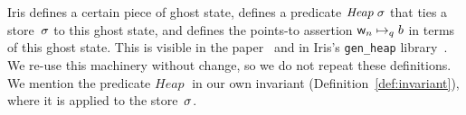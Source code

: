 \begin{comment}
A ghost memory cell in Iris is a memory cell that does not exist at runtime.
The ownership and the content of a physical memory cell are described via a
points-to predicate such as $\loc\pointsto\val$. Similarly, the ownership and
content of a ghost cell are described by an Iris assertion, usually written
$\ownGhost\gamma{a}$, where $\gamma$ is the name of the ghost cell and $a$ is
its content. Whereas the content of a physical memory cell is a
programming-language value~$\val$, the content of a ghost cell inhabits a
mathematical structure, a \emph{camera}~\cite[\S4.4]{iris}, which the user
chooses when the ghost cell is created. A camera is equipped with a
composition operation~$\cdot$ and the ghost state assertion satisfies the law
$\ownGhost\gamma{a\cdot b} \equiv \ownGhost\gamma{a} \star
\ownGhost\gamma{b}$. Thus, the choice of a suitable camera determines in what
ways the ghost state can be split.

A key Iris idiom involves the use of the \emph{authoritative
  camera}~\cite[\S6.3.3]{iris} together with an Iris invariant.
The elements of the authoritative camera include
\emph{authoritative elements} $\authfull{c}$ and
\emph{fragmentary elements} $\authfrag{b}$.
The composition law is defined in such a way that
there always exists at most one authoritative element
and the composition of all fragmentary elements in existence is
contained in the authoritative element, etc.
\end{comment}
\newcommand{\genheapinterp}[1]{\mathit{Heap}\;#1}
\newcommand{\pred}[1]{\ownGhost\gammaPred{\authfull{(\mapone\predstore)}}}
\newcommand{\mapone}[1]{1.#1}
\newcommand{\mapsfromexact}[3]{
  \ownGhost\gammaPred{\authfrag{\singletonMap{#1}{(#2, #3)}}}
}
\newcommand{\sh}{L'}
\newcommand{\mapsfromdef}[3]{
  \exists\sh.\;
  \mapsfromexact{#1}{#2}{\sh} \star \pure{\sh \subseteq #3}
}


\begin{assumption}
\label{assumption}
  Iris defines a certain piece of ghost state,
  defines a predicate $\genheapinterp\store$
  that ties a store~$\sigma$ to this ghost state,
  and defines the points-to assertion $\mathsf{w}_n\mathrel{\mapsto_{q}}b$
  in terms of this ghost state.
  This is visible in the paper~\cite[\S6.3.2]{iris}
  and in Iris's \texttt{gen\_heap} library~\cite{genheap}.
  We re-use this machinery without change,
  so we do not repeat these definitions.
  We mention the predicate $\genheapinterp\!$
  in our own invariant (Definition~\ref{def:invariant}),
  where it is applied to the \logical store~$\sigma$.
\end{assumption}

